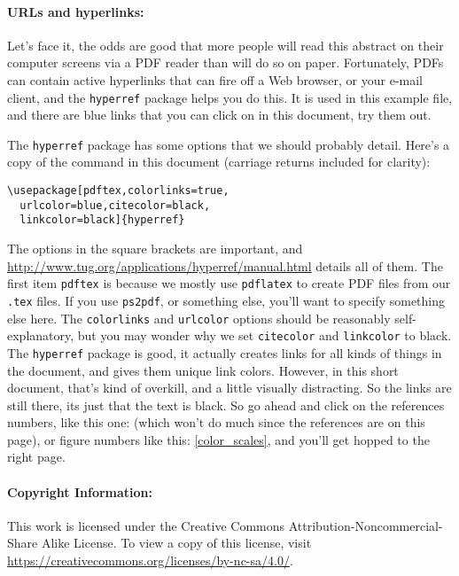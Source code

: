 \documentclass[twoside]{article}
\begin{document}
\paragraph{URLs and hyperlinks:}

Let's face it, the odds are good that more people will read this
abstract on their computer screens via a PDF reader than will do
so on paper.  Fortunately, PDFs can contain active hyperlinks that
can fire off a Web browser, or your e-mail client, and the
\verb=hyperref= package helps you do this.  It is used in this
example file, and there are blue links that you can click on in
this document, try them out.

The \verb=hyperref= package has some options that we should probably 
detail.  Here's a copy of the command in this document (carriage returns 
included for clarity):
\begin{verbatim}
\usepackage[pdftex,colorlinks=true,
  urlcolor=blue,citecolor=black,
  linkcolor=black]{hyperref}
\end{verbatim}
\noindent
The options in the square brackets are important, and
\url{http://www.tug.org/applications/hyperref/manual.html} details
all of them.  The first item \verb=pdftex= is because we mostly use
\verb=pdflatex= to create PDF files from our \verb=.tex= files.  If
you use \verb=ps2pdf=, or something else, you'll want to specify
something else here.  The \verb=colorlinks= and \verb=urlcolor=
options should be reasonably self-explanatory, but you may wonder
why we set \verb=citecolor= and \verb=linkcolor= to black.  The
\verb=hyperref= package is good, it actually creates links for all
kinds of things in the document, and gives them unique link colors.
However, in this short document, that's kind of overkill, and a
little visually distracting.  So the links are still there, its
just that the text is black.  So go ahead and click on the references
numbers, like this one: \citep{latexguide} (which won't do much since
the references are on this page), or figure numbers like
this: \ref{color_scales}, and you'll get hopped to the right page.


\paragraph{Copyright Information:}

This work is licensed under the Creative Commons
Attribution-Noncommercial-Share Alike License. To view a copy
of this license, visit \url{https://creativecommons.org/licenses/by-nc-sa/4.0/}.
\end{document}
